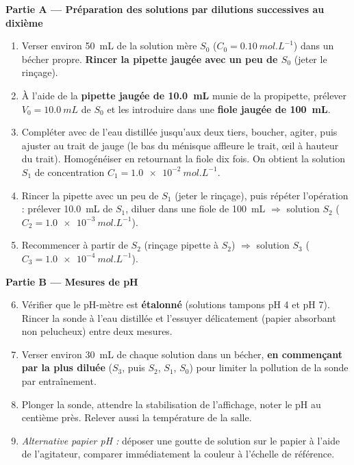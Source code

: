 \documentclass[11pt]{article}
\begin{document}
\textbf{Partie A — Préparation des solutions par dilutions successives au dixième}

\begin{enumerate}
\item Verser environ \SI{50}{mL} de la solution mère $S_0$ ($C_0 = \SI{0,10}{mol.L^{-1}}$) dans un bécher propre. \textbf{Rincer la pipette jaugée avec un peu de $S_0$} (jeter le rinçage).
\item À l'aide de la \textbf{pipette jaugée de \SI{10,0}{mL}} munie de la propipette, prélever $V_0 = \SI{10,0}{mL}$ de $S_0$ et les introduire dans une \textbf{fiole jaugée de \SI{100}{mL}}.
\item Compléter avec de l'eau distillée jusqu'aux deux tiers, boucher, agiter, puis ajuster au trait de jauge (le bas du ménisque affleure le trait, œil à hauteur du trait). Homogénéiser en retournant la fiole dix fois. On obtient la solution $S_1$ de concentration $C_1 = \SI{1,0e-2}{mol.L^{-1}}$.
\item Rincer la pipette avec un peu de $S_1$ (jeter le rinçage), puis répéter l'opération : prélever \SI{10,0}{mL} de $S_1$, diluer dans une fiole de \SI{100}{mL} $\Rightarrow$ solution $S_2$ ($C_2 = \SI{1,0e-3}{mol.L^{-1}}$).
\item Recommencer à partir de $S_2$ (rinçage pipette à $S_2$) $\Rightarrow$ solution $S_3$ ($C_3 = \SI{1,0e-4}{mol.L^{-1}}$).
\end{enumerate}

\textbf{Partie B — Mesures de pH}

\begin{enumerate}
\setcounter{enumi}{5}
\item Vérifier que le pH-mètre est \textbf{étalonné} (solutions tampons pH 4 et pH 7). Rincer la sonde à l'eau distillée et l'essuyer délicatement (papier absorbant non pelucheux) entre deux mesures.
\item Verser environ \SI{30}{mL} de chaque solution dans un bécher, \textbf{en commençant par la plus diluée} ($S_3$, puis $S_2$, $S_1$, $S_0$) pour limiter la pollution de la sonde par entraînement.
\item Plonger la sonde, attendre la stabilisation de l'affichage, noter le pH au centième près. Relever aussi la température de la salle.
\item \emph{Alternative papier pH :} déposer une goutte de solution sur le papier à l'aide de l'agitateur, comparer immédiatement la couleur à l'échelle de référence.
\end{enumerate}
\end{document}
